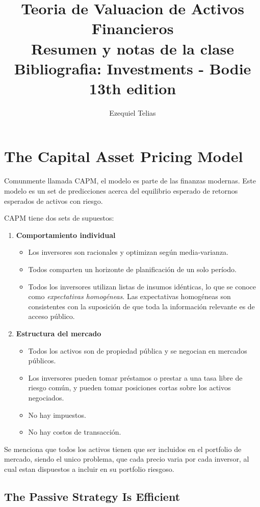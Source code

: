 \documentclass{article}
\title{
    \textbf{Teoria de Valuacion de Activos Financieros} \\ 
    Resumen y notas de la clase
    \\
    \small Bibliografia: Investments - Bodie 13th edition
}
\author{Ezequiel Telias}
\date{}
\begin{document}
\maketitle

\section{The Capital Asset Pricing Model}
Comunmente llamada CAPM, el modelo es parte de las finanzas modernas. Este modelo es un set de predicciones acerca del equilibrio esperado de retornos esperados
de activos con riesgo. 

CAPM tiene dos sets de supuestos:

\begin{enumerate}
  \item \textbf{Comportamiento individual}
    \begin{itemize}
      \item Los inversores son racionales y optimizan según media-varianza.
      \item Todos comparten un horizonte de planificación de un solo período.
      \item Todos los inversores utilizan listas de insumos idénticas, lo que se conoce como \emph{expectativas homogéneas}. Las expectativas homogéneas son consistentes con la suposición de que toda la información relevante es de acceso público.
    \end{itemize}
    
  \item \textbf{Estructura del mercado}
    \begin{itemize}
      \item Todos los activos son de propiedad pública y se negocian en mercados públicos.
      \item Los inversores pueden tomar préstamos o prestar a una tasa libre de riesgo común, y pueden tomar posiciones cortas sobre los activos negociados.
      \item No hay impuestos.
      \item No hay costos de transacción.
    \end{itemize}
\end{enumerate}

Se menciona que todos los activos tienen que ser incluidos en el portfolio de mercado, siendo el unico problema, que cada precio varia por cada inversor,
 al cual estan dispuestos a incluir en su portfolio riesgoso.

 \subsection{The Passive Strategy Is Efficient}
\end{document}

